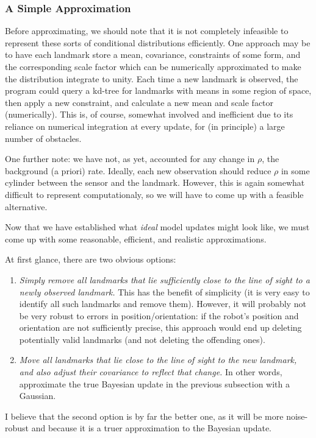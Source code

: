 \documentclass[12pt]{article}
\begin{document}
\subsubsection{A Simple Approximation}

Before approximating, we should note that it is not completely infeasible to represent these sorts of conditional distributions efficiently. One approach may be to have each landmark store a mean, covariance, constraints of some form, and the corresponding scale factor which can be numerically approximated to make the distribution integrate to unity. Each time a new landmark is observed, the program could query a kd-tree for landmarks with means in some region of space, then apply a new constraint, and calculate a new mean and scale factor (numerically). This is, of course, somewhat involved and inefficient due to its reliance on numerical integration at every update, for (in principle) a large number of obstacles.

One further note: we have not, as yet, accounted for any change in $\rho$, the background (a priori) rate. Ideally, each new observation should reduce $\rho$ in some cylinder between the sensor and the landmark. However, this is again somewhat difficult to represent computationaly, so we will have to come up with a feasible alternative.

Now that we have established what \textit{ideal} model updates might look like, we must come up with some reasonable, efficient, and realistic approximations.

At first glance, there are two obvious options:
\begin{enumerate}
\item \textit{Simply remove all landmarks that lie sufficiently close to the line of sight to a newly observed landmark.} This has the benefit of simplicity (it is very easy to identify all such landmarks and remove them). However, it will probably not be very robust to errors in position/orientation: if the robot's position and orientation are not sufficiently precise, this approach would end up deleting potentially valid landmarks (and not deleting the offending ones).
\item \textit{Move all landmarks that lie close to the line of sight to the new landmark, and also adjust their covariance to reflect that change.} In other words, approximate the true Bayesian update in the previous subsection with a Gaussian.
\end{enumerate}

I believe that the second option is by far the better one, as it will be more noise-robust and because it is a truer approximation to the Bayesian update.
\end{document}
